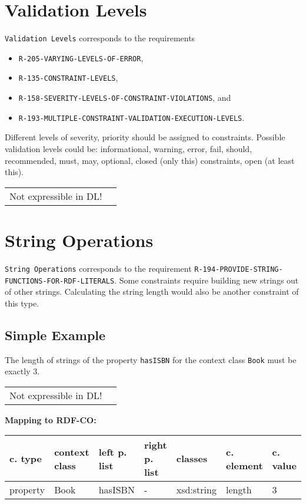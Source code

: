 \documentclass{llncs}
\newcommand{\ms}[1]{\texttt{#1}}
\newenvironment{gcotable}{
  \scriptsize
  \sffamily
  \vspace{0cm}
	\begin{center}
	\textbf{\vspace{0.4cm}Mapping to RDF-CO:} \\
  \begin{tabular}{l|l|l|l|l|l|l}
	\hline
  \textbf{c. type} & \textbf{context class} & \textbf{left p. list} & \textbf{right p. list} & \textbf{classes} & \textbf{c. element} & \textbf{c. value} \\
  \hline

}{
  \hline
  \end{tabular}
	\end{center}
}
\newenvironment{DL}{
  \vspace{0cm}
	\begin{center}
  \begin{tabular}{r l}

}{
  \end{tabular}
	\end{center}
}
\begin{document}
\section{Validation Levels}

\ms{Validation Levels} corresponds to the requirements

\begin{itemize}
	\item \ms{R-205-VARYING-LEVELS-OF-ERROR},
	\item \ms{R-135-CONSTRAINT-LEVELS},
	\item \ms{R-158-SEVERITY-LEVELS-OF-CONSTRAINT-VIOLATIONS}, and
	\item \ms{R-193-MULTIPLE-CONSTRAINT-VALIDATION-EXECUTION-LEVELS}.
\end{itemize}

Different levels of severity, priority should be assigned to constraints.
Possible validation levels could be: informational, warning, error, fail, should, recommended, must, may, optional, closed (only this) constraints, open (at least this).

\begin{DL}
Not expressible in DL!
\end{DL}

\section{String Operations}

\ms{String Operations} corresponds to the requirement
\ms{R-194-PROVIDE-STRING-} \ms{FUNCTIONS-FOR-RDF-LITERALS}.
Some constraints require building new strings out of other strings.
Calculating the string length would also be another constraint of this type.

\subsection{Simple Example}

The length of strings of the property \ms{hasISBN} for the context class \ms{Book} must be exactly 3.

\begin{DL}
Not expressible in DL!
\end{DL}

\begin{gcotable}
property & Book & hasISBN & - & xsd:string & length & 3 \\
\end{gcotable}
\end{document}
